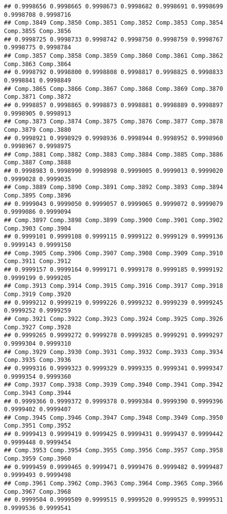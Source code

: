 \documentclass[
]{article}
\begin{document}
\begin{verbatim}
## 0.9998656 0.9998665 0.9998673 0.9998682 0.9998691 0.9998699 0.9998708 0.9998716 
## Comp.3849 Comp.3850 Comp.3851 Comp.3852 Comp.3853 Comp.3854 Comp.3855 Comp.3856 
## 0.9998725 0.9998733 0.9998742 0.9998750 0.9998759 0.9998767 0.9998775 0.9998784 
## Comp.3857 Comp.3858 Comp.3859 Comp.3860 Comp.3861 Comp.3862 Comp.3863 Comp.3864 
## 0.9998792 0.9998800 0.9998808 0.9998817 0.9998825 0.9998833 0.9998841 0.9998849 
## Comp.3865 Comp.3866 Comp.3867 Comp.3868 Comp.3869 Comp.3870 Comp.3871 Comp.3872 
## 0.9998857 0.9998865 0.9998873 0.9998881 0.9998889 0.9998897 0.9998905 0.9998913 
## Comp.3873 Comp.3874 Comp.3875 Comp.3876 Comp.3877 Comp.3878 Comp.3879 Comp.3880 
## 0.9998921 0.9998929 0.9998936 0.9998944 0.9998952 0.9998960 0.9998967 0.9998975 
## Comp.3881 Comp.3882 Comp.3883 Comp.3884 Comp.3885 Comp.3886 Comp.3887 Comp.3888 
## 0.9998983 0.9998990 0.9998998 0.9999005 0.9999013 0.9999020 0.9999028 0.9999035 
## Comp.3889 Comp.3890 Comp.3891 Comp.3892 Comp.3893 Comp.3894 Comp.3895 Comp.3896 
## 0.9999043 0.9999050 0.9999057 0.9999065 0.9999072 0.9999079 0.9999086 0.9999094 
## Comp.3897 Comp.3898 Comp.3899 Comp.3900 Comp.3901 Comp.3902 Comp.3903 Comp.3904 
## 0.9999101 0.9999108 0.9999115 0.9999122 0.9999129 0.9999136 0.9999143 0.9999150 
## Comp.3905 Comp.3906 Comp.3907 Comp.3908 Comp.3909 Comp.3910 Comp.3911 Comp.3912 
## 0.9999157 0.9999164 0.9999171 0.9999178 0.9999185 0.9999192 0.9999199 0.9999205 
## Comp.3913 Comp.3914 Comp.3915 Comp.3916 Comp.3917 Comp.3918 Comp.3919 Comp.3920 
## 0.9999212 0.9999219 0.9999226 0.9999232 0.9999239 0.9999245 0.9999252 0.9999259 
## Comp.3921 Comp.3922 Comp.3923 Comp.3924 Comp.3925 Comp.3926 Comp.3927 Comp.3928 
## 0.9999265 0.9999272 0.9999278 0.9999285 0.9999291 0.9999297 0.9999304 0.9999310 
## Comp.3929 Comp.3930 Comp.3931 Comp.3932 Comp.3933 Comp.3934 Comp.3935 Comp.3936 
## 0.9999316 0.9999323 0.9999329 0.9999335 0.9999341 0.9999347 0.9999354 0.9999360 
## Comp.3937 Comp.3938 Comp.3939 Comp.3940 Comp.3941 Comp.3942 Comp.3943 Comp.3944 
## 0.9999366 0.9999372 0.9999378 0.9999384 0.9999390 0.9999396 0.9999402 0.9999407 
## Comp.3945 Comp.3946 Comp.3947 Comp.3948 Comp.3949 Comp.3950 Comp.3951 Comp.3952 
## 0.9999413 0.9999419 0.9999425 0.9999431 0.9999437 0.9999442 0.9999448 0.9999454 
## Comp.3953 Comp.3954 Comp.3955 Comp.3956 Comp.3957 Comp.3958 Comp.3959 Comp.3960 
## 0.9999459 0.9999465 0.9999471 0.9999476 0.9999482 0.9999487 0.9999493 0.9999498 
## Comp.3961 Comp.3962 Comp.3963 Comp.3964 Comp.3965 Comp.3966 Comp.3967 Comp.3968 
## 0.9999504 0.9999509 0.9999515 0.9999520 0.9999525 0.9999531 0.9999536 0.9999541 

\end{verbatim}
\end{document}
